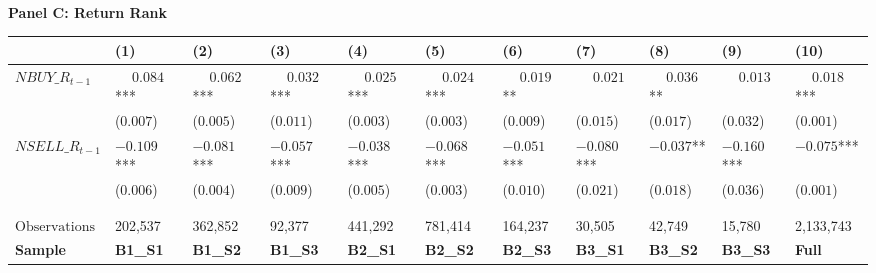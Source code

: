 \begin{landscape}
\begin{table}
\centering\fontsize{9}{11}\selectfont

\begin{threeparttable}
\phantom{ }\\
\textbf{Panel C: Return Rank}
\begin{tabular}[t]{>{\raggedright\arraybackslash}p{2.8cm}>{\raggedright\arraybackslash}p{1.7cm}>{\raggedright\arraybackslash}p{1.7cm}>{\raggedright\arraybackslash}p{1.7cm}>{\raggedright\arraybackslash}p{1.7cm}>{\raggedright\arraybackslash}p{1.7cm}>{\raggedright\arraybackslash}p{1.7cm}>{\raggedright\arraybackslash}p{1.7cm}>{\raggedright\arraybackslash}p{1.7cm}>{\raggedright\arraybackslash}p{1.7cm}>{\raggedright\arraybackslash}p{1.7cm}}
\toprule
 & \phantom{-}(1) & \phantom{-}(2) & \phantom{-}(3) & \phantom{-}(4) & \phantom{-}(5) & \phantom{-}(6) & \phantom{-}(7) & \phantom{-}(8) & \phantom{-}(9) & \phantom{-}(10)\\
\midrule
$NBUY\_R_{t-1}$ & $\phantom{-}0.084$*** & $\phantom{-}0.062$*** & $\phantom{-}0.032$*** & $\phantom{-}0.025$*** & $\phantom{-}0.024$*** & $\phantom{-}0.019$** & $\phantom{-}0.021$ & $\phantom{-}0.036$** & $\phantom{-}0.013$ & $\phantom{-}0.018$***\\
 & (\phantom{-}$0.007$) & (\phantom{-}$0.005$) & (\phantom{-}$0.011$) & (\phantom{-}$0.003$) & (\phantom{-}$0.003$) & (\phantom{-}$0.009$) & (\phantom{-}$0.015$) & (\phantom{-}$0.017$) & (\phantom{-}$0.032$) & (\phantom{-}$0.001$)\\
\addlinespace
$NSELL\_R_{t-1}$ & $-0.109$*** & $-0.081$*** & $-0.057$*** & $-0.038$*** & $-0.068$*** & $-0.051$*** & $-0.080$*** & $-0.037$** & $-0.160$*** & $-0.075$***\\
 & (\phantom{-}$0.006$) & (\phantom{-}$0.004$) & (\phantom{-}$0.009$) & (\phantom{-}$0.005$) & (\phantom{-}$0.003$) & (\phantom{-}$0.010$) & (\phantom{-}$0.021$) & (\phantom{-}$0.018$) & (\phantom{-}$0.036$) & (\phantom{-}$0.001$)\\
 &  &  &  &  &  &  &  &  &  \vphantom{1} & \\
\midrule
 &  &  &  &  &  &  &  &  &  & \\
$\textrm{Observations}$ & {\phantom{-}202,537} & {\phantom{-}362,852} & {\phantom{-}92,377} & {\phantom{-}441,292} & {\phantom{-}781,414} & {\phantom{-}164,237} & {\phantom{-}30,505} & {\phantom{-}42,749} & {\phantom{-}15,780} & {\phantom{-}2,133,743}\\
\textbf{Sample} & \textbf{B1\_S1} & \textbf{B1\_S2} & \textbf{B1\_S3} & \textbf{B2\_S1} & \textbf{B2\_S2} & \textbf{B2\_S3} & \textbf{B3\_S1} & \textbf{B3\_S2} & \textbf{B3\_S3} & \textbf{Full}\\

\end{tabular}
\end{threeparttable}
\end{table}
\end{landscape}
